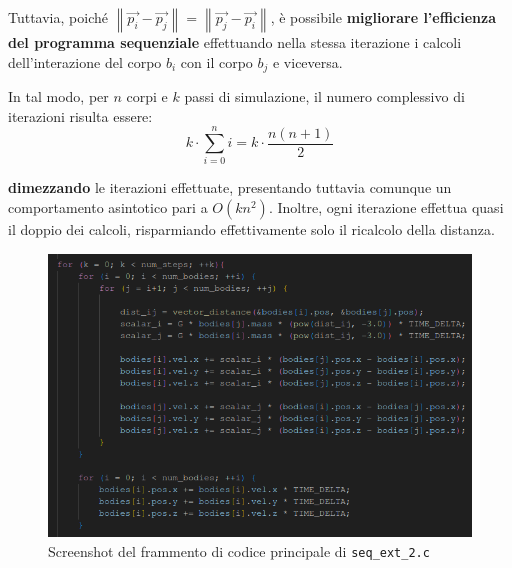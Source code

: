 \documentclass[12pt]{report}
\newcommand{\norm}[1]{\left\|#1\right\|}
\renewcommand\vec{\overrightarrow}
\begin{document}
    Tuttavia, poiché $\norm{\vec{p_i} - \vec{p_j}} = \norm{\vec{p_j} - \vec{p_i}}$, è possibile \textbf{migliorare l'efficienza del programma sequenziale} effettuando nella stessa iterazione i calcoli dell'interazione del corpo $b_i$ con il corpo $b_j$ e viceversa.

    In tal modo, per $n$ corpi e $k$ passi di simulazione, il numero complessivo di iterazioni risulta essere:
    \[k \cdot \sum_{i=0}^n i = k \cdot \frac{n(n+1)}{2}\] 

    \textbf{dimezzando} le iterazioni effettuate, presentando tuttavia comunque un  comportamento asintotico pari a $O(kn^2)$. Inoltre, ogni iterazione effettua quasi il doppio dei calcoli, risparmiando effettivamente solo il ricalcolo della distanza.

    \begin{figure}[H]
        \centering
        \includegraphics[width=\textwidth]{images/seq_ext_2.png}
        \caption{Screenshot del frammento di codice principale di \texttt{seq\_ext\_2.c}}
        \label{fig:seq_ext_2}
    \end{figure}
\end{document}

